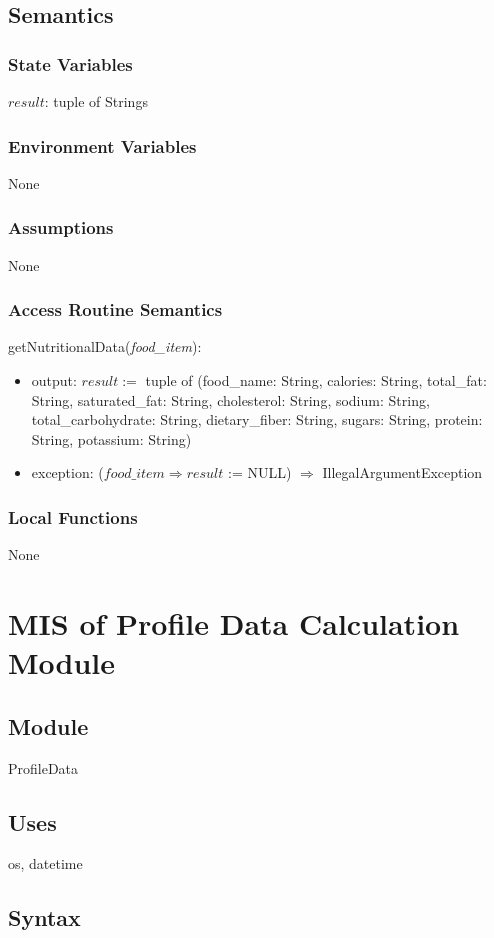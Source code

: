 \documentclass[12pt, titlepage]{article}
\begin{document}
\subsection{Semantics}
\subsubsection{State Variables}
$result$: tuple of Strings
\subsubsection{Environment Variables}
None
\subsubsection{Assumptions}
None
\subsubsection{Access Routine Semantics}
\noindent getNutritionalData(\textit{food\_item}):
\begin{itemize}
	\item output: $result :=$ tuple of (food\_name: String, calories: String, 
	total\_fat: String, saturated\_fat: String, cholesterol: String, sodium: 
	String, total\_carbohydrate: String, dietary\_fiber: String, sugars: 
	String, protein: String, potassium: String)
	\item exception: ($food\_item \Rightarrow result$ := NULL) $\Rightarrow$ \mbox{IllegalArgumentException} 
\end{itemize}
\subsubsection{Local Functions}
None

\newpage

\section{MIS of Profile Data Calculation Module} \label{PDC}
\subsection{Module}
ProfileData
\subsection{Uses}
os, datetime
\subsection{Syntax}
\end{document}
